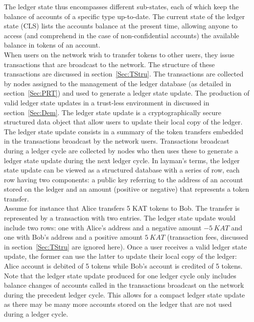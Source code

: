 The ledger state thus encompasses different sub-states, each of which keep the balance of accounts of a specific type up-to-date. The current state of the ledger state (CLS) lists the accounts balance at the present time, allowing anyone to access (and comprehend in the case of non-confidential accounts) the available balance in tokens of an account. \\

When users on the network wish to transfer tokens to other users, they issue transactions that are broadcast to the network. The structure of these transactions are discussed in section~\ref{Sec:TStru}. The transactions are collected by nodes assigned to the management of the ledger database (as detailed in section~\ref{Sec:PRT}) and used to generate a ledger state update. The production of valid ledger state updates in a trust-less environment in discussed in section~\ref{Sec:Dem}. The ledger state update is a cryptographically secure structured data object that allow users to update their local copy of the ledger. \\

The ledger state update consists in a summary of the token transfers embedded in the transactions broadcast by the network users. Transactions broadcast during a ledger cycle are collected by nodes who then uses these to generate a ledger state update during the next ledger cycle.  In layman's terms, the ledger state update can be viewed as a structured database with a series of row, each row having two components: a public key referring to the address of an account stored on the ledger and an amount (positive or negative) that represents a token transfer.\\ 

Assume for instance that Alice transfers 5 KAT tokens to Bob. The transfer is represented by a transaction with two entries. The ledger state update would include two rows: one with Alice's address and a negative amount $-5~KAT$ and one with Bob's address and a positive amount $5~KAT$ (transaction fees, discussed in section~\ref{Sec:TStru} are ignored here). Once a user receives a valid ledger state update, the former can use the latter to update their local copy of the ledger: Alice account is debited of 5 tokens while Bob's account is credited of 5 tokens. Note that the ledger state update produced for one ledger cycle only includes balance changes of accounts called in the transactions broadcast on the network during the precedent ledger cycle. This allows for a compact ledger state update as there may be many more accounts stored on the ledger that are not used during a ledger cycle.\\

